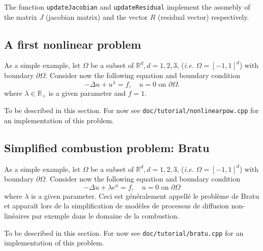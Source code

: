 \documentclass[a4paper]{book}
\newenvironment{nota}{%
  \begin{pictonote}{\ficnota}}{\end{pictonote}}
\begin{document}
The function \lstinline!updateJacobian! and \lstinline!updateResidual!
implement the assmebly of the matrix $J$ (jacobian matrix) and the
vector $R$ (residual vector) respectively.

\subsection{A first nonlinear problem}
\label{sec:bratu}

As a simple example, let $\Omega$ be a subset of $\mathbb{R}^d, d=1,2,3$,
(\emph{i.e.} $\Omega=[-1,1]^d$) with boundary $\partial
\Omega$. Consider now the following equation and boundary condition
\begin{equation}
  \label{eq:29}
  -\Delta u + u^\lambda = f,\quad u = 0 \text{ on } \partial \Omega.
\end{equation}
where $\lambda \in \mathbb{R_+}$ is a given parameter and $f=1$.


\begin{nota}
  To be described in this section. For now see
  \texttt{doc/tutorial/nonlinearpow.cpp} for an implementation of this
  problem.
\end{nota}

\subsection{Simplified combustion problem: Bratu}
\label{sec:bratu}

As a simple example, let $\Omega$ be a subset of $\mathbb{R}^d, d=1,2,3$,
(\emph{i.e.} $\Omega=[-1,1]^d$) with boundary $\partial
\Omega$. Consider now the following equation and boundary condition
\begin{equation}
  \label{eq:29}
  -\Delta u + \lambda e^u = f,\quad u = 0 \text{ on } \partial \Omega
\end{equation}
where $\lambda$ is a given parameter. Ceci est généralement appellé le
problème de Bratu et apparaît lors de la simplification de modèles de
processus de diffusion non-linéaires par exemple dans le domaine de la
combustion.

\begin{nota}
  To be described in this section. For now see
  \texttt{doc/tutorial/bratu.cpp} for an implementation of this
  problem.
\end{nota}


\end{document}
